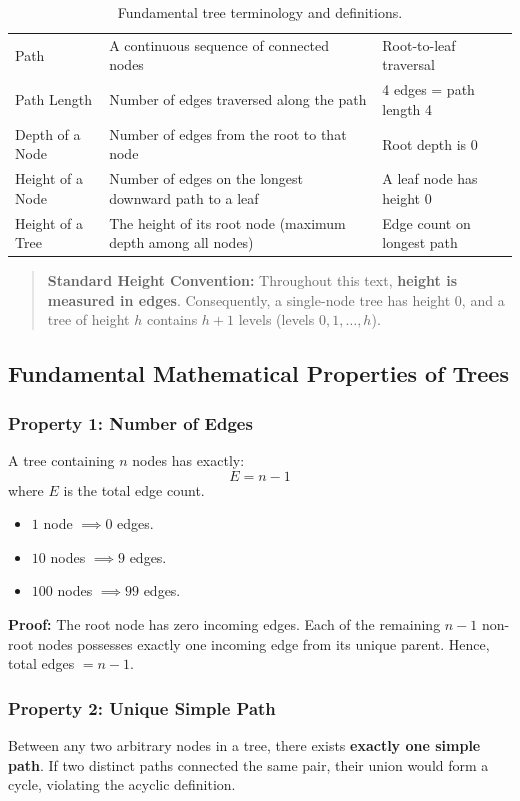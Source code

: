 \begin{table}[htbp]
\begin{tabularx}{\textwidth}{l p{7.5cm} X}
Path             & A continuous sequence of connected nodes                    & Root-to-leaf traversal \\
Path Length      & Number of edges traversed along the path                    & 4 edges = path length 4 \\
Depth of a Node  & Number of edges from the root to that node                  & Root depth is $0$ \\
Height of a Node & Number of edges on the longest downward path to a leaf      & A leaf node has height $0$ \\
Height of a Tree & The height of its root node (maximum depth among all nodes) & Edge count on longest path \\
\bottomrule
\end{tabularx}
\caption{Fundamental tree terminology and definitions.}
\end{table}

\begin{quote}
\textbf{Standard Height Convention:} Throughout this text, \textbf{height is measured in edges}. Consequently, a single-node tree has height $0$, and a tree of height $h$ contains $h + 1$ levels (levels $0, 1, \dots, h$).
\end{quote}

\subsection{Fundamental Mathematical Properties of Trees}

\subsubsection{Property 1: Number of Edges}
A tree containing $n$ nodes has exactly:
\[
\boxed{E = n - 1}
\]
where $E$ is the total edge count.
\begin{itemize}
    \item $1$ node $\implies 0$ edges.
    \item $10$ nodes $\implies 9$ edges.
    \item $100$ nodes $\implies 99$ edges.
\end{itemize}
\textbf{Proof:} The root node has zero incoming edges. Each of the remaining $n - 1$ non-root nodes possesses exactly one incoming edge from its unique parent. Hence, total edges $= n - 1$.

\subsubsection{Property 2: Unique Simple Path}
Between any two arbitrary nodes in a tree, there exists \textbf{exactly one simple path}. If two distinct paths connected the same pair, their union would form a cycle, violating the acyclic definition.

